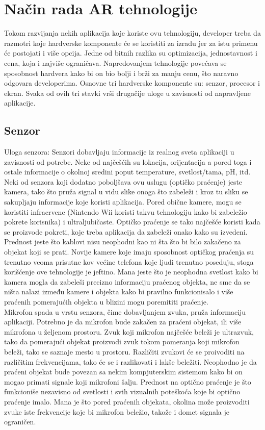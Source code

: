 \documentclass[a4paper]{article}
\begin{document}
	\section{Način rada AR tehnologije}
	\label{sec:Način rada AR tehnologije}
    Tokom razvijanja nekih aplikacija koje koriste ovu tehnologiju, developer treba da razmotri koje hardverske komponente će se koristiti za izradu jer za istu primenu će postojati i više opcija. Jedne od bitnih razlika su optimizacija, jednostavnost i cena, koja i najviše ograničava. Napredovanjem tehnologije povećava se sposobnost hardvera kako bi on bio bolji i brži za manju cenu, što naravno odgovara developerima.
	Osnovne tri hardverske komponente su: senzor, procesor i ekran. Svaka od ovih tri stavki vrši drugačije uloge u zavisnosti od napravljene aplikacije.
	\subsection{Senzor}
    \label{sec:Senzor}
    Uloga senzora: Senzori dobavljaju informacije iz realnog sveta aplikaciji u zavisnosti od potrebe. Neke od najčešćih su lokacija, orijentacija a pored toga i ostale informacije o okolnoj sredini poput temperature, svetlost/tama, pH, itd.\\
	Neki od senzora koji dodatno poboljšava ovu uslugu (optičko praćenje) jeste kamera, tako što pruža signal u vidu slike onoga što zabeleži i kroz tu sliku se sakupljaju informacije koje koristi aplikacija. Pored obične kamere, mogu se koristiti infracrvene (Nintendo Wii koristi takvu tehnologiju kako bi zabeležio pokrete korisnika)  i ultraljubičaste. Optičko praćenje se tako najčešće koristi kada se proizvode pokreti, koje treba aplikacija da zabeleži onako kako su izvedeni. Prednost jeste što kablovi nisu neophodni kao ni šta što bi bilo zakačeno za objekat koji se prati.  Novije kamere koje imaju sposobnost optičkog praćenja su trenutno veoma prisutne kov većine telefona koje ljudi trenutno poseduju, stoga korišćenje ove tehnologije je jeftino. Mana jeste što je neophodna svetlost kako bi kamera mogla da zabeleši precizno informaciju praćenog objekta, ne sme da se ništa nalazi između kamere i objekta kako bi pravilno funkcionisalo i više praćenih pomerajućih objekta u blizini mogu poremititi praćenje.\\
	Mikrofon spada u vrstu senzora, čime dobavljanjem zvuka, pruža informaciju aplikaciji. Potrebno je da mikrofon bude zakačen za praćeni objekat, ili više mikrofona u željenom prostoru. Zvuk koji mikrofon najčešće beleži je ultrazvuk, tako da pomerajući objekat proizvodi zvuk tokom pomeranja koji mikrofon beleži, tako se saznaje mesto u prostoru. Različiti zvukovi će se proivoditi na različitim frekvencijama, tako će se i razlikovati i lakše beležiti. Neophodno je da praćeni objekat bude povezan sa nekim kompjuterskim sistemom kako bi on mogao primati signale koji mikrofoni šalju. Prednost na optično praćenje je što funkcioniše nezavisno od svetlosti i svih vizualnih poteškoća koje bi optično praćenje imalo. Mana je što pored praćenih objekata, okolina može proizvoditi zvuke iste frekvencije koje bi mikrofon beležio,  takože i domet signala je ograničen.\\
\end{document}
